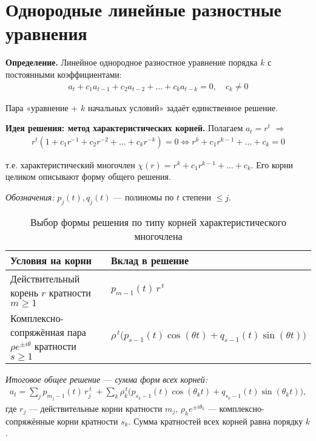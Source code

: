 \section{Однородные линейные разностные уравнения}\label{sec:homogeneous}

\begin{center}
\end{center}

\textbf{Определение.} Линейное однородное разностное уравнение порядка $k$ с постоянными коэффициентами:
\begin{align}
a_t + c_1 a_{t-1} + c_2 a_{t-2} + \dots + c_k a_{t-k} = 0, \quad c_k \neq 0
\end{align}

Пара «уравнение + $k$ начальных условий» задаёт единственное решение.

\textbf{Идея решения: метод характеристических корней.} Полагаем $a_t = r^t$ $\Rightarrow$
\begin{align}
r^t (1 + c_1 r^{-1} + c_2 r^{-2} + \dots + c_k r^{-k}) = 0 \iff r^k + c_1 r^{k-1} + \dots + c_k = 0
\end{align}

т.е. характеристический многочлен $\chi(r) = r^k + c_1 r^{k-1} + \dots + c_k$. Его корни целиком описывают форму общего решения.

\textit{Обозначения:} $p_j(t), q_j(t)$ — полиномы по $t$ степени $\le j$.

\begin{table}[h!]
\centering
\caption{Выбор формы решения по типу корней характеристического многочлена}
\label{tab:form-choices}
\begin{tabular}{|l|l|}
\hline
\textbf{Условия на корни} & \textbf{Вклад в решение} \\
\hline
Действительный корень $r$ кратности $m\ge 1$ &
$p_{m-1}(t)\, r^{\,t}$ \\
\hline
Комплексно-сопряжённая пара $\rho e^{\pm i\theta}$ кратности $s\ge 1$ &
$\rho^{\,t}\big(p_{s-1}(t)\cos(\theta t)+q_{s-1}(t)\sin(\theta t)\big)$ \\
\hline
\end{tabular}

\vspace{0.5em}
\emph{Итоговое общее решение — сумма форм всех корней:}
\begin{align*}
a_t = \sum_{j} p_{m_j-1}(t)\, r_j^{\,t}
\; + \sum_{k} \rho_k^{\,t}\big(p_{s_k-1}(t)\cos(\theta_k t)+q_{s_k-1}(t)\sin(\theta_k t)\big),
\end{align*}
где $r_j$ — действительные корни кратности $m_j$, $\rho_k e^{\pm i\theta_k}$ — комплексно-сопряжённые корни кратности $s_k$.
Сумма кратностей всех корней равна порядку $k$.
\end{table}

